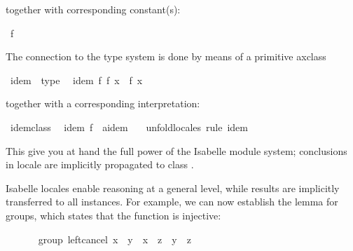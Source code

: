 \begin{isabellebody}
\begin{isamarkuptext}%
\noindent together with corresponding constant(s):%
\end{isamarkuptext}%
\isamarkuptrue%
\isamarkupfalse%
\ f\ {\isacharcolon}{\isacharcolon}\ {\isachardoublequoteopen}{\isasymalpha}\ {\isasymRightarrow}\ {\isasymalpha}{\isachardoublequoteclose}%
\begin{isamarkuptext}%
\noindent The connection to the type system is done by means
  of a primitive axclass%
\end{isamarkuptext}%
\isamarkuptrue%
\isamarkupfalse%
\ idem\ {\isacharless}\ type\isanewline
\ \ idem{\isacharcolon}\ {\isachardoublequoteopen}f\ {\isacharparenleft}f\ x{\isacharparenright}\ {\isacharequal}\ f\ x{\isachardoublequoteclose}%
\begin{isamarkuptext}%
\noindent together with a corresponding interpretation:%
\end{isamarkuptext}%
\isamarkuptrue%
\isamarkupfalse%
\ idem{\isacharunderscore}class{\isacharcolon}\isanewline
\ \ idem\ {\isacharbrackleft}{\isachardoublequoteopen}f\ {\isasymColon}\ {\isacharparenleft}{\isacharprime}a{\isasymColon}idem{\isacharparenright}\ {\isasymRightarrow}\ {\isasymalpha}{\isachardoublequoteclose}{\isacharbrackright}\isanewline
%
\isadelimproof
%
\endisadelimproof
%
\isatagproof
{}\isamarkupfalse%
\ unfold{\isacharunderscore}locales\ {\isacharparenleft}rule\ idem{\isacharparenright}%
\endisatagproof
{\isafoldproof}%
%
\isadelimproof
%
\endisadelimproof
%
\isadelimML
%
\endisadelimML
%
\isatagML
%
\endisatagML
{\isafoldML}%
%
\isadelimML
%
\endisadelimML
%
\begin{isamarkuptext}%
This give you at hand the full power of the Isabelle module system;
  conclusions in locale  are implicitly propagated
  to class .%
\end{isamarkuptext}%
\isamarkuptrue%
%
\isamarkuptrue%
%
\begin{isamarkuptext}%
Isabelle locales enable reasoning at a general level, while results
  are implicitly transferred to all instances.  For example, we can
  now establish the  lemma for groups, which
  states that the function  is injective:%
\end{isamarkuptext}%
\isamarkuptrue%
\ \ \ \ \isamarkupfalse%
\ {\isacharparenleft}\ group{\isacharparenright}\ left{\isacharunderscore}cancel{\isacharcolon}\ {\isachardoublequoteopen}x\ {\isasymotimes}\ y\ {\isacharequal}\ x\ {\isasymotimes}\ z\ {\isasymlongleftrightarrow}\ y\ {\isacharequal}\ z{\isachardoublequoteclose}\isanewline

\end{isabellebody}
